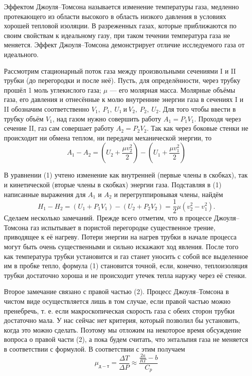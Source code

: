 \documentclass[12pt,a4paper]{article}
\begin{document}
Эффектом Джоуля–Томсона называется изменение температуры газа, медленно протекающего из области высокого в область низкого давления в условиях хорошей тепловой изоляции. 
В разреженных газах, которые приближаются по своим свойствам к идеальному газу, при таком течении температура газа не меняется. 
Эффект Джоуля–Томсона демонстрирует отличие исследуемого газа от идеального.

Рассмотрим стационарный поток газа между произвольными сечениями I и II трубки (до перегородки и после неё).
Пусть, для определённости, через трубку прошёл 1 моль углекислого газа; $\mu$ — его молярная масса. 
Молярные объёмы газа, его давления и отнесённые к молю внутренние энергии газа в сечениях I и II обозначим соответственно $V_1,\ P_1,\ U_1\ и\ V_2,\ P_2,\ U_2$. 
Для того чтобы ввести в трубку объём $V_1$, над газом нужно совершить работу $A_1 = P_1V_1$. 
Проходя через сечение II, газ сам совершает работу $A_2 = P_2V_2$. 
Так как через боковые стенки не происходит ни обмена теплом, ни передачи механической энергии, то
\begin{equation}
    A_1 - A_2 = \left( U_2 + \frac{\mu v_2 ^2}{2}\right) - \left(U_1 + \frac{\mu v_1^2}{2}\right)
\end{equation}

В уравнении (1) учтено изменение как внутренней (первые члены в скобках), так и кинетической (вторые члены в скобках) энергии газа. 
Подставляя в (1) написанные выражения для $A_1$ и $A_2$ и перегруппировывая члены, найдём
\begin{equation}
    H_1 - H_2 = (U_1 + P_1 V_1) - (U_2 + P_2 V_2) = \frac 1 2\mu (v_2^2 - v_1^2).
\end{equation}
Сделаем несколько замечаний. 
Прежде всего отметим, что в процессе Джоуля–Томсона газ испытывает в пористой перегородке существенное трение, приводящее к её нагреву. 
Потери энергии на нагрев трубки в начале процесса могут быть очень существенными и сильно искажают ход явления. 
После того как температура трубки установится и газ станет уносить с собой все выделенное им в пробке тепло, формула (1) становится точной, если, конечно, теплоизоляция трубки достаточно хороша и не происходит утечек тепла наружу через её стенки.

Второе замечание связано с правой частью (2). 
Процесс Джоуля–Томсона в чистом виде осуществляется лишь в том случае, если правой частью можно пренебречь, т. е. если макроскопическая скорость газа с обеих сторон трубки достаточно мала. 
У нас сейчас нет критерия, который позволил бы установить, когда это можно сделать. 
Поэтому мы отложим на некоторое время обсуждение вопроса о правой части (2), а пока будем считать, что энтальпия газа не меняется в соответствии с формулой.
В соответствии с этим получаем
\begin{equation}
    \mu_{д-т} = \frac {\Delta T}{\Delta P} \approx \frac {\frac {2a}{RT} - b}{C_p}
\end{equation}
\end{document}
